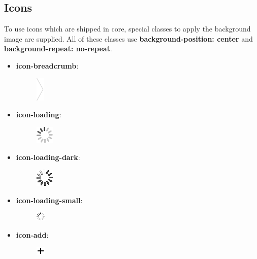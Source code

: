 \documentclass[letterpaper,10pt,english]{sphinxmanual}
\begin{document}
\subsection{Icons}
\label{app/css:icons}
To use icons which are shipped in core, special classes to apply the background image are supplied. All of these classes use \textbf{background-position: center} and \textbf{background-repeat: no-repeat}.
\begin{itemize}
\item {} \begin{description}
\item[{\textbf{icon-breadcrumb}:}] \leavevmode
\includegraphics{breadcrumb.png}

\end{description}

\item {} \begin{description}
\item[{\textbf{icon-loading}:}] \leavevmode
\includegraphics{loading.png}

\end{description}

\item {} \begin{description}
\item[{\textbf{icon-loading-dark}:}] \leavevmode
\includegraphics{loading-dark.png}

\end{description}

\item {} \begin{description}
\item[{\textbf{icon-loading-small}:}] \leavevmode
\includegraphics{loading-small.png}

\end{description}

\item {} \begin{description}
\item[{\textbf{icon-add}:}] \leavevmode
\includegraphics{add.png}


\end{description}
\end{itemize}
\end{document}
